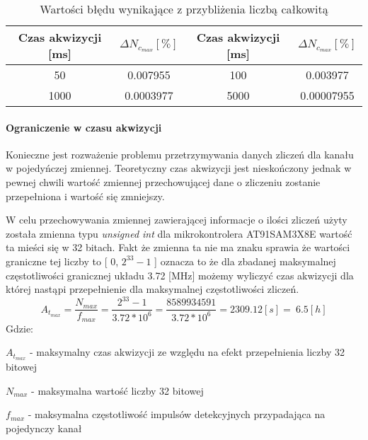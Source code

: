\begin{table}
        \centering
        \caption{Wartości błędu wynikające z przybliżenia liczbą całkowitą}
        \label{tab przyblizenie niep}
        \begin{tabular}{|c|c||c|c|}
                \hline
                Czas akwizycji [ms] &   $\Delta N_{c_{max}} [\%]$&Czas akwizycji [ms] &   $\Delta N_{c_{max}} [\%]$ \\ \hline
                50 & 0.007955 & 100 & 0.003977 \\ \hline
                1000 & 0.0003977 & 5000 & 0.00007955 \\ \hline
        \end{tabular}
\end{table}

\paragraph{Ograniczenie w czasu akwizycji}

Konieczne jest rozważenie problemu przetrzymywania danych zliczeń dla kanału w pojedyńczej zmiennej. Teoretyczny czas akwizycji jest nieskończony jednak w pewnej chwili wartość zmiennej przechowującej dane o zliczeniu zostanie przepełniona i wartość się zmniejszy.

W celu przechowywania zmiennej zawierającej informacje o ilości zliczeń użyty została zmienna typu \textit{unsigned int} dla mikrokontrolera AT91SAM3X8E wartość ta mieści się w 32 bitach. Fakt że zmienna ta nie ma znaku sprawia że wartości graniczne tej liczby to [ 0, $2^{33}-1$ ] oznacza to że dla zbadanej maksymalnej częstotliwości granicznej układu 3.72 [MHz] możemy wyliczyć czas akwizycji dla której nastąpi przepełnienie dla maksymalnej częstotliwości zliczeń. 
\begin{equation}
        A_{t_{max}} = \frac{N_{max}}{f_{max}} = \frac{2^{33}-1}{3.72 * 10^{6}} = \frac{8589934591}{3.72 * 10^{6}} = 2309.12 [s] = ~6.5 [h]
\end{equation}
Gdzie:
\begin{description}
        \item $A_{t_{max}}$ - maksymalny czas akwizycji ze względu na efekt przepełnienia liczby 32 bitowej
        \item $N_{max}$ - maksymalna wartość liczby 32 bitowej
        \item $f_{max}$ - maksymalna częstotliwość impulsów detekcyjnych przypadająca na pojedynczy kanał
\end{description}

